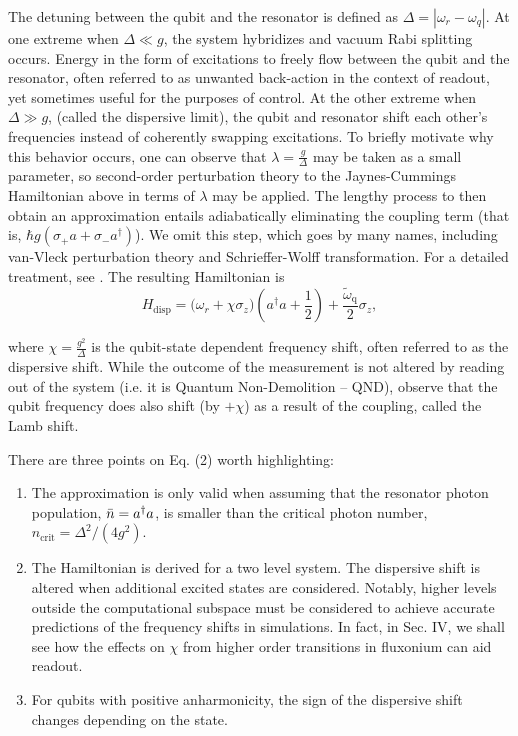 \documentclass[
 reprint,
 superscriptaddress,
 bibnotes,
 amsmath,
 amssymb,
 aps,
 prb,
 citeautoscript,
 floatfix,
]{revtex4-2}
\begin{document}
The detuning between the qubit and the resonator is defined as $\Delta = |\omega_r - \omega_q|$. At one extreme when $\Delta \ll g$, the system hybridizes and vacuum Rabi splitting occurs. Energy in the form of excitations to freely flow between the qubit and the resonator, often referred to as unwanted back-action in the context of readout, yet sometimes useful for the purposes of control. At the other extreme when $\Delta \gg g$, (called the dispersive limit), the qubit and resonator shift each other's frequencies instead of coherently swapping excitations. To briefly motivate why this behavior occurs, one can observe that $\lambda = \frac{g}{\Delta}$ may be taken as a small parameter, so second-order perturbation theory to the Jaynes-Cummings Hamiltonian above in terms of $\lambda$ may be applied. The lengthy process to then obtain an approximation entails adiabatically eliminating the coupling term (that is, $\hbar g \left( \sigma_{+}a + \sigma_{-}a^{\dagger}\right)$). We omit this step, which goes by many names, including van-Vleck perturbation theory and Schrieffer-Wolff transformation. For a detailed treatment, see \cite{}. The resulting Hamiltonian is
\begin{equation}
    H_{\text{disp}} = \bigg( \omega_r +\chi \sigma_z\bigg) \left( a^{\dagger}a + \frac{1}{2}\right) + \frac{\widetilde{\omega}_{\text{q}}}{2}\sigma_z,
\label{Eq:JCHdisp}
\end{equation}

where $\chi = \frac{g^2}{\Delta}$ is the qubit-state dependent frequency shift, often referred to as the dispersive shift. While the outcome of the measurement is not altered by reading out of the system (i.e. it is Quantum Non-Demolition – QND), observe that the qubit frequency does also shift (by $+\chi$) as a result of the coupling, called the Lamb shift. 

There are three points on Eq. (2) worth highlighting: 
\begin{enumerate}
\item The approximation is only valid when assuming that the resonator photon population,  $\Bar{n} = a^{\dagger} a$, is smaller than the critical photon number, $n_{\text{crit}} = \Delta^2 / (4g^2)$. 
    \item The Hamiltonian is derived for a two level system. The dispersive shift is altered when additional excited states are considered. Notably, higher levels outside the computational subspace must be considered to achieve accurate predictions of the frequency shifts in simulations. In fact, in Sec. IV, we shall see how the effects on $\chi$ from higher order transitions in fluxonium can aid  readout. 
    \item For qubits with positive anharmonicity, the sign of the dispersive shift  changes depending on the state. 
\end{enumerate} 
\end{document}
